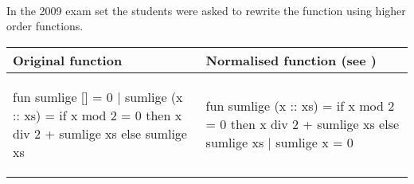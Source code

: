 \begin{example}\
  \label{ex:fold-instance-sumlige}\\
  In the 2009 exam set the students were asked to rewrite the 
  function using higher order functions.

  \begin{center}
    \begin{tabular}{|l|l|}
      \hline
      \textbf{Original function}
      &
      \textbf{Normalised function}
      \footnotesize{(see \fref{tr:trace-normalise-sumlige})}
      \\\hline
  \begin{sml}
fun sumlige [] = 0
  | sumlige (x :: xs) =
      if x mod 2 = 0
      then x div 2 + sumlige xs
      else sumlige xs
  \end{sml}
      &
  \begin{sml}
fun sumlige (x :: xs) =
      if x mod 2 = 0
      then x div 2 + sumlige xs
      else sumlige xs
  | sumlige x = 0
  \end{sml}
  \\\hline
    \end{tabular}
  \end{center}


\end{example}
